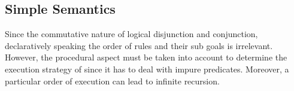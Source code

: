 \documentclass[thesis-solanki.tex]{subfiles}
\begin{document}

\subsection{Simple Semantics}

Since the commutative nature of logical disjunction and conjunction, declaratively speaking the order of rules and their sub goals is
irrelevant. However, the procedural aspect must be taken into account to determine the execution strategy of  since it
has to deal with impure predicates. Moreover, a particular order of execution can lead to infinite recursion.
\end{document}
